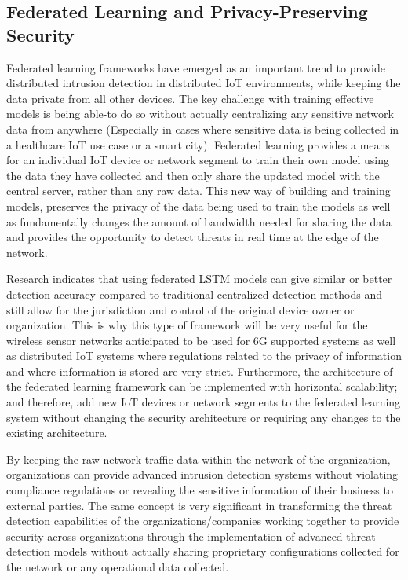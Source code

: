 \documentclass[12pt]{article}
\begin{document}
\subsection{Federated Learning and Privacy-Preserving Security}
Federated learning frameworks have emerged as an important trend to provide distributed intrusion detection in distributed IoT environments, while keeping the data private from all other devices. The key challenge with training effective models is being able-to do so without actually centralizing any sensitive network data from anywhere (Especially in cases where sensitive data is being collected in a healthcare IoT use case or a smart city). Federated learning provides a means for an individual IoT device or network segment to train their own model using the data they have collected and then only share the updated model with the central server, rather than any raw data. This new way of building and training models, preserves the privacy of the data being used to train the models as well as fundamentally changes the amount of bandwidth needed for sharing the data and provides the opportunity to detect threats in real time at the edge of the network.



Research indicates that using federated LSTM models can give similar or better detection accuracy compared to traditional centralized detection methods and still allow for the jurisdiction and control of the original device owner or organization. This is why this type of framework will be very useful for the wireless sensor networks anticipated to be used for 6G supported systems as well as distributed IoT systems where regulations related to the privacy of information and where information is stored are very strict. Furthermore, the architecture of the federated learning framework can be implemented with horizontal scalability; and therefore, add new IoT devices or network segments to the federated learning system without changing the security architecture or requiring any changes to the existing architecture.



By keeping the raw network traffic data within the network of the organization, organizations can provide advanced intrusion detection systems without violating compliance regulations or revealing the sensitive information of their business to external parties. The same concept is very significant in transforming the threat detection capabilities of the organizations/companies working together to provide security across organizations through the implementation of advanced threat detection models without actually sharing proprietary configurations collected for the network or any operational data collected.
\end{document}
